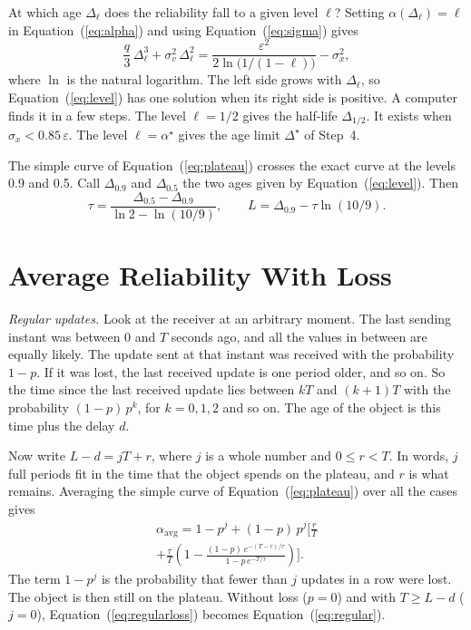 \documentclass[conference]{IEEEtran}
\newcommand{\at}{\alpha^{\star}}             %
\newcommand{\Dl}{\Delta^{\star}}             %
\newcommand{\aav}{\alpha_{\mathrm{avg}}}     %
\newcommand{\Dh}{\Delta_{1/2}}               %
\newcommand{\Eq}[1]{Equation~(\ref{#1})}     %
\begin{document}
At which age $\Delta_\ell$ does the reliability fall to a given level $\ell$?
Setting $\alpha(\Delta_\ell)=\ell$ in \Eq{eq:alpha} and using \Eq{eq:sigma}
gives
\begin{equation}\label{eq:level}
\frac{q}{3}\,\Delta_\ell^3+\sigma_v^2\,\Delta_\ell^2
=\frac{\varepsilon^2}{2\ln\!\big(1/(1-\ell)\big)}-\sigma_x^2 ,
\end{equation}
where $\ln$ is the natural logarithm. The left side grows with
$\Delta_\ell$, so \Eq{eq:level} has one solution when its right side is
positive. A computer finds it in a few steps. The level $\ell=1/2$ gives the
half-life $\Dh$. It exists when $\sigma_x<0.85\,\varepsilon$. The level
$\ell=\at$ gives the age limit $\Dl$ of Step~4.

The simple curve of \Eq{eq:plateau} crosses the exact curve at the levels 0.9
and 0.5. Call $\Delta_{0.9}$ and $\Delta_{0.5}$ the two ages given by
\Eq{eq:level}. Then
\begin{equation}
\tau=\frac{\Delta_{0.5}-\Delta_{0.9}}{\ln 2-\ln(10/9)},\qquad
L=\Delta_{0.9}-\tau\ln(10/9).
\end{equation}

\section{Average Reliability With Loss}\label{app:averages}

\emph{Regular updates.} Look at the receiver at an arbitrary moment. The last
sending instant was between 0 and $T$ seconds ago, and all the values in
between are equally likely. The update sent at that instant was received with
the probability $1-p$. If it was lost, the last received update is one period
older, and so on. So the time since the last received update lies between $kT$
and $(k+1)T$ with the probability $(1-p)\,p^k$, for $k=0,1,2$ and so on. The
age of the object is this time plus the delay $d$.

Now write $L-d=jT+r$, where $j$ is a whole number and $0\le r<T$. In words,
$j$ full periods fit in the time that the object spends on the plateau, and
$r$ is what remains. Averaging the simple curve of \Eq{eq:plateau} over all
the cases gives
\begin{multline}\label{eq:regularloss}
\aav=1-p^{j}+(1-p)\,p^{j}\Bigg[\frac{r}{T}\\
+\frac{\tau}{T}\left(1-\frac{(1-p)\,e^{-(T-r)/\tau}}
{1-p\,e^{-T/\tau}}\right)\Bigg].
\end{multline}
The term $1-p^{j}$ is the probability that fewer than $j$ updates in a row
were lost. The object is then still on the plateau. Without loss ($p=0$) and
with $T\ge L-d$ ($j=0$), \Eq{eq:regularloss} becomes \Eq{eq:regular}.
\end{document}
